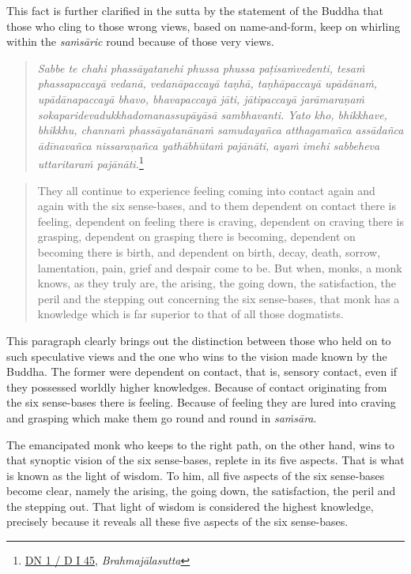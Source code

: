 This fact is further clarified in the sutta by the statement of the Buddha that those who cling to those wrong views, based on name-and-form, keep on whirling within the \emph{saṁsāric} round because of those very views.

\begin{quote}
\emph{Sabbe te chahi phassāyatanehi phussa phussa paṭisaṁvedenti, tesaṁ phassapaccayā vedanā, vedanāpaccayā taṇhā, taṇhāpaccayā upādānaṁ, upādānapaccayā bhavo, bhavapaccayā jāti, jātipaccayā jarāmaraṇaṁ sokaparidevadukkhadomanassupāyāsā sambhavanti. Yato kho, bhikkhave, bhikkhu, channaṁ phassāyatanānaṁ samudayañca atthagamañca assādañca ādīnavañca nissaraṇañca yathābhūtaṁ pajānāti, ayaṁ imehi sabbeheva uttaritaraṁ pajānāti.}\footnote{\href{https://suttacentral.net/dn1/pli/ms}{DN 1 / D I 45}, \emph{Brahmajālasutta}}
\end{quote}

\begin{quote}
They all continue to experience feeling coming into contact again and again with the six sense-bases, and to them dependent on contact there is feeling, dependent on feeling there is craving, dependent on craving there is grasping, dependent on grasping there is becoming, dependent on becoming there is birth, and dependent on birth, decay, death, sorrow, lamentation, pain, grief and despair come to be. But when, monks, a monk knows, as they truly are, the arising, the going down, the satisfaction, the peril and the stepping out concerning the six sense-bases, that monk has a knowledge which is far superior to that of all those dogmatists.
\end{quote}

This paragraph clearly brings out the distinction between those who held on to such speculative views and the one who wins to the vision made known by the Buddha. The former were dependent on contact, that is, sensory contact, even if they possessed worldly higher knowledges. Because of contact originating from the six sense-bases there is feeling. Because of feeling they are lured into craving and grasping which make them go round and round in \emph{saṁsāra}.

The emancipated monk who keeps to the right path, on the other hand, wins to that synoptic vision of the six sense-bases, replete in its five aspects. That is what is known as the light of wisdom. To him, all five aspects of the six sense-bases become clear, namely the arising, the going down, the satisfaction, the peril and the stepping out. That light of wisdom is considered the highest knowledge, precisely because it reveals all these five aspects of the six sense-bases.


